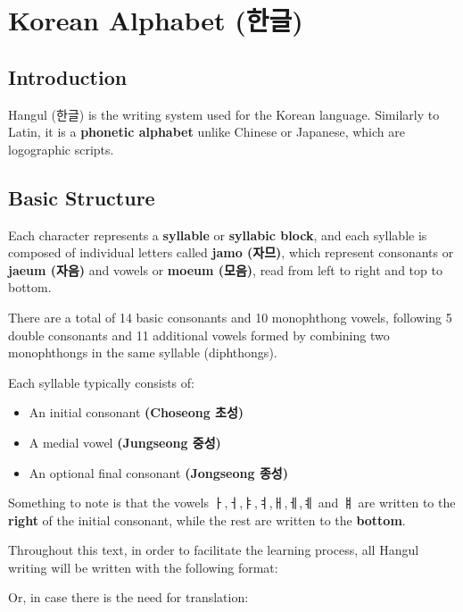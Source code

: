 \section{Korean Alphabet (한글)}
\subsection{Introduction}
Hangul (한글) is the writing system used for the Korean language. Similarly to Latin, it is a \textbf{phonetic alphabet} unlike Chinese or Japanese, which are logographic scripts. 

\subsection{Basic Structure}
Each character represents a \textbf{syllable} or \textbf{syllabic block}, and each syllable is composed of individual letters called \textbf{jamo (자므)}, which represent consonants or \textbf{jaeum (자음)} and vowels or \textbf{moeum (모음)}, read from left to right and top to bottom.

There are a total of 14 basic consonants and 10 monophthong vowels, following 5 double consonants and 11 additional vowels formed by combining two monophthongs in the same syllable (diphthongs).

Each syllable typically consists of:

\begin{itemize}
    \item An initial consonant \textbf{(Choseong 초성)}
    \item A medial vowel \textbf{(Jungseong 중성)}
    \item An optional final consonant \textbf{(Jongseong 종성)}
\end{itemize}

Something to note is that the vowels ㅏ,ㅓ,ㅑ,ㅕ,ㅐ,ㅔ,ㅖ and ㅒ are written to the \textbf{right} of the initial consonant, while the rest are written to the \textbf{bottom}.

Throughout this text, in order to facilitate the learning process, all Hangul writing will be written with the following format:

\begin{center}
\end{center}

Or, in case there is the need for translation:

\begin{center}
\end{center}

